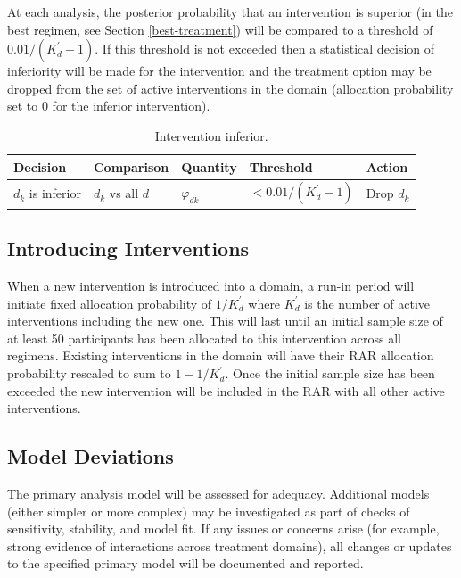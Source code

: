 \documentclass[
  11pt,
]{article}
\begin{document}
At each analysis, the posterior probability that an intervention is superior (in the best regimen, see Section \ref{best-treatment}) will be compared to a threshold of \(0.01/(K_d^\prime-1)\).
If this threshold is not exceeded then a statistical decision of inferiority will be made for the intervention and the treatment option may be dropped from the set of active interventions in the domain (allocation probability set to 0 for the inferior intervention).

\begin{table}[H]

\caption{\label{tab:unnamed-chunk-5}Intervention inferior.}
\centering
\begin{tabular}[t]{lllll}
\toprule
Decision & Comparison & Quantity & Threshold & Action\\
\midrule
$d_k$ is inferior & $d_k$ vs all $d$ & $\varphi_{dk}$ & $<0.01/(K_d^\prime-1)$ & Drop $d_k$\\
\bottomrule
\end{tabular}
\end{table}

\hypertarget{introducing-interventions}{%
\subsection{Introducing Interventions}\label{introducing-interventions}}

When a new intervention is introduced into a domain, a run-in period will initiate fixed allocation probability of \(1/K_d^\prime\) where \(K_d^\prime\) is the number of active interventions including the new one.
This will last until an initial sample size of at least 50 participants has been allocated to this intervention across all regimens.
Existing interventions in the domain will have their RAR allocation probability rescaled to sum to \(1 - 1/K_d^\prime\).
Once the initial sample size has been exceeded the new intervention will be included in the RAR with all other active interventions.

\hypertarget{model-deviations}{%
\subsection{Model Deviations}\label{model-deviations}}

The primary analysis model will be assessed for adequacy.
Additional models (either simpler or more complex) may be investigated as part of checks of sensitivity, stability, and model fit.
If any issues or concerns arise (for example, strong evidence of interactions across treatment domains), all changes or updates to the specified primary model will be documented and reported.
\end{document}
